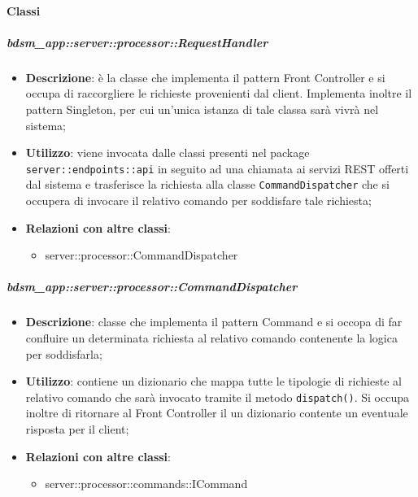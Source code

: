   \paragraph{Classi} %

    \subparagraph{bdsm\_app::server::processor::RequestHandler} %
    \label{subp:bdsm_app_server_processor_requesthandler}
    \begin{itemize}
      \item \textbf{Descrizione}: è la classe che implementa il pattern Front Controller e si occupa di raccorgliere le richieste provenienti dal client. Implementa inoltre il pattern Singleton, per cui un'unica istanza di tale classa sarà vivrà nel sistema;
      \item \textbf{Utilizzo}: viene invocata dalle classi presenti nel package \texttt{server::endpoints::api} in seguito ad una chiamata ai servizi REST offerti dal sistema e trasferisce la richiesta alla classe \texttt{CommandDispatcher} che si occupera di invocare il relativo comando per soddisfare tale richiesta;
      \item \textbf{Relazioni con altre classi}:
        \begin{itemize}
          \item server::processor::CommandDispatcher
        \end{itemize}
      \end{itemize}

    \subparagraph{bdsm\_app::server::processor::CommandDispatcher} %
    \label{subp:bdsm_app_server_:processor_commanddispatcher}
    \begin{itemize}
      \item \textbf{Descrizione}: classe che implementa il pattern Command e si occopa di far confluire un determinata richiesta al relativo comando contenente la logica per soddisfarla;
      \item \textbf{Utilizzo}: contiene un dizionario che mappa tutte le tipologie di richieste al relativo comando che sarà invocato tramite il metodo \texttt{dispatch()}. Si occupa inoltre di ritornare al Front Controller il un dizionario contente un eventuale risposta per il client;
      \item \textbf{Relazioni con altre classi}:
        \begin{itemize}
          \item server::processor::commands::ICommand
        \end{itemize}
      \end{itemize}

